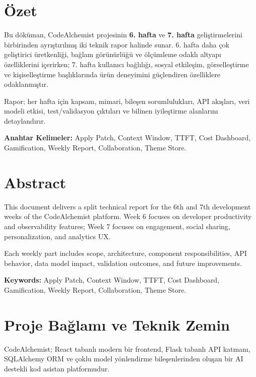 \documentclass[12pt,a4paper]{article}
\begin{document}
\thispagestyle{empty}

\newpage
\section*{Özet}

Bu döküman, CodeAlchemist projesinin \textbf{6. hafta} ve \textbf{7. hafta} geliştirmelerini birbirinden ayrıştırılmış iki teknik rapor halinde sunar. 6. hafta daha çok geliştirici üretkenliği, bağlam görünürlüğü ve ölçümleme odaklı altyapı özelliklerini içerirken; 7. hafta kullanıcı bağlılığı, sosyal etkileşim, görselleştirme ve kişiselleştirme başlıklarında ürün deneyimini güçlendiren özelliklere odaklanmıştır.

Rapor; her hafta için kapsam, mimari, bileşen sorumlulukları, API akışları, veri modeli etkisi, test/validasyon çıktıları ve bilinen iyileştirme alanlarını detaylandırır.

\textbf{Anahtar Kelimeler:} Apply Patch, Context Window, TTFT, Cost Dashboard, Gamification, Weekly Report, Collaboration, Theme Store.

\section*{Abstract}

This document delivers a split technical report for the 6th and 7th development weeks of the CodeAlchemist platform. Week 6 focuses on developer productivity and observability features; Week 7 focuses on engagement, social sharing, personalization, and analytics UX.

Each weekly part includes scope, architecture, component responsibilities, API behavior, data model impact, validation outcomes, and future improvements.

\textbf{Keywords:} Apply Patch, Context Window, TTFT, Cost Dashboard, Gamification, Weekly Report, Collaboration, Theme Store.

\newpage
\tableofcontents
\newpage

\section{Proje Bağlamı ve Teknik Zemin}

CodeAlchemist; React tabanlı modern bir frontend, Flask tabanlı API katmanı, SQLAlchemy ORM ve çoklu model yönlendirme bileşenlerinden oluşan bir AI destekli kod asistan platformudur.
\end{document}
